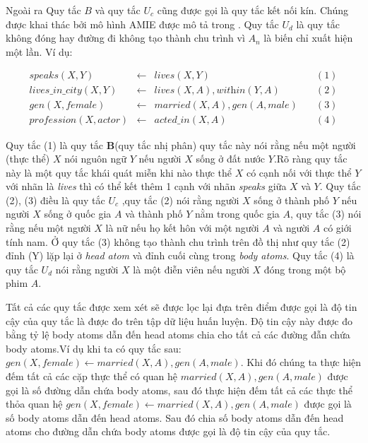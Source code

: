 Ngoài ra Quy tắc \(B\) và quy tắc \(U_c\) cũng được gọi là quy tắc kết nối kín. Chúng được khai thác bởi mô hình  AMIE được mô tả trong \cite{AMIE,galarraga2015fast}. Quy tắc \(U_d\) là quy tắc không đóng hay đường đi không tạo thành chu trình vì \(A_n\) là biến chỉ xuất hiện một lần. Ví dụ:

\begin{equation*}
\begin{matrix}
	\textit{speaks}(X, Y ) & \gets & \textit{lives}(X, Y) & \quad (1) \\
	\textit{lives\_in\_city}(X, Y ) & \gets & \textit{lives}(X, A),\textit{within}(Y, A)  & \quad  (2) \\
	\textit{gen}(X, female) & \gets & \textit{married}(X, A), \textit{gen}(A, male)  & \quad  (3) \\
	\textit{profession}(X, actor) &  \gets & \textit{acted\_in}(X, A)  & \quad (4)
\end{matrix}
\end{equation*}


Quy tắc (1) là quy tắc \textbf{B}(quy tắc nhị phân) quy tắc này nói rằng nếu một người (thực thể) \(X\) nói nguôn ngữ \(Y\) nếu người \(X\) sống  ở đất nước \(Y\).Rõ ràng quy tắc này là một quy tắc khái quát miễn khi nào thực thể \(X\) có cạnh nối với thực thể \(Y\) với nhãn là \textit{lives} thì có thể kết thêm 1 cạnh với nhãn \textit{speaks} giữa \(X\) và \(Y\). Quy tắc (2), (3) điều là quy tắc \(U_c\) ,quy tắc (2) nói rằng người \(X\) sống ở thành phố \(Y\) nếu người \(X\) sống ở quốc gia \(A\) và thành phố \(Y\) nằm trong quốc gia \(A\), quy tắc (3) nói rằng nếu một người \(X\) là nữ nếu họ kết hôn với một người \(A\) và người \(A\) có giới tính nam. Ở quy tắc (3) không tạo thành chu trình trên đồ thị như quy tắc (2) đỉnh (Y) lặp lại  ở \textit{head atom} và đỉnh cuối cùng trong \textit{body atoms}. Quy tắc (4) là quy tắc \(U_d\) nói rằng người \(X\) là một điễn viên nếu người \(X\) đóng trong một bộ phim \(A\).

Tất cả các quy tắc được xem xét sẽ được lọc lại đựa trên điểm được gọi là độ tin cậy của quy tắc là được đo trên tập dữ liệu huấn luyện. Độ tin cậy này được đo bằng tỷ lệ body atoms dẫn đến head atoms chia cho tất cả các đường đẫn chứa body atoms.Ví dụ khi ta có quy tắc sau:
\(\textit{gen}(X, female) \gets \textit{married}(X, A), \textit{gen}(A, male) \). Khi đó chúng ta thực hiện đếm tất cả các cặp thực thể có quan hệ  \(\textit{married}(X, A), \textit{gen}(A, male) \) được gọi là số đường dẫn chứa body atoms, sau đó thực hiện đếm tất cả các  thực thể thỏa quan hệ \(\textit{gen}(X, female) \gets \textit{married}(X, A), \textit{gen}(A, male) \) được gọi là số body atoms dẫn đến head atoms. Sau đó chia số body atoms dẫn đến head atoms cho  đường dẫn chứa body atoms được gọi là độ tin cậy của quy tắc.

